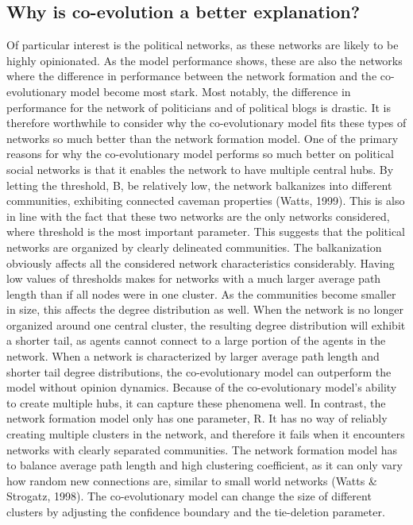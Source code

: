 \documentclass{article}
\begin{document}
\subsection{Why is co-evolution a better explanation?}

Of particular interest is the political networks, as these networks are likely to be highly opinionated. As the model performance shows, these are also the networks where the difference in performance between the network formation and the co-evolutionary model become most stark. Most notably, the difference in performance for the network of politicians and of political blogs is drastic. It is therefore worthwhile to consider why the co-evolutionary model fits these types of networks so much better than the network formation model.
One of the primary reasons for why the co-evolutionary model performs so much better on political social networks is that it enables the network to have multiple central hubs. By letting the threshold, B, be relatively low, the network balkanizes into different communities, exhibiting connected caveman properties (Watts, 1999). This is also in line with the fact that these two networks are the only networks considered, where threshold is the most important parameter. This suggests that the political networks are organized by clearly delineated communities. The balkanization obviously affects all the considered network characteristics considerably. Having low values of thresholds makes for networks with a much larger average path length than if all nodes were in one cluster.  As the communities become smaller in size, this affects the degree distribution as well. When the network is no longer organized around one central cluster, the resulting degree distribution will exhibit a shorter tail, as agents cannot connect to a large portion of the agents in the network. When a network is characterized by larger average path length and shorter tail degree distributions, the co-evolutionary model can outperform the model without opinion dynamics. Because of the co-evolutionary model’s ability to create multiple hubs, it can capture these phenomena well. In contrast, the network formation model only has one parameter, R. It has no way of reliably creating multiple clusters in the network, and therefore it fails when it encounters networks with clearly separated communities. The network formation model has to balance average path length and high clustering coefficient, as it can only vary how random new connections are, similar to small world networks (Watts \& Strogatz, 1998). The co-evolutionary model can change the size of different clusters by adjusting the confidence boundary and the tie-deletion parameter. 
\end{document}
